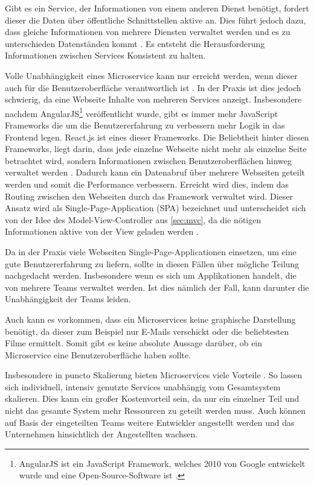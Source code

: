 Gibt es ein Service, der Informationen von einem anderen Dienst benötigt, fordert dieser die Daten über öffentliche Schnittstellen aktive an. Dies führt jedoch dazu, dass gleiche Informationen von mehrere Diensten verwaltet werden und es zu unterschieden Datenständen kommt \parencite[vgl.][Kap. 4.1]{wolff_microservices_2018}. Es entsteht die Herausforderung Informationen zwischen Services Konsistent zu halten.

Volle Unabhängigkeit eines Microservice kann nur erreicht werden, wenn dieser auch für die Benutzeroberfläche verantwortlich ist \parencite[vgl.][Kap. 4.4]{wolff_microservices_2018}. In der Praxis ist dies jedoch schwierig, da eine Webseite Inhalte von mehreren Services anzeigt. Insbesondere nachdem AngularJS\footnote{AngularJS ist ein JavaScript Framework, welches 2010 von Google entwickelt wurde und eine Open-Source-Software ist \parencite{angularjs}.} veröffentlicht wurde, gibt es immer mehr JavaScript Frameworks die um die Benutzererfahrung zu verbessern mehr Logik in das Frontend legen. React.js ist eines dieser Frameworks. Die Beliebtheit hinter diesen Frameworks, liegt darin, dass jede einzelne Webseite nicht mehr als einzelne Seite betrachtet wird, sondern Informationen zwischen Benutzeroberflächen hinweg verwaltet werden \parencite[vgl.][Kap. 9.1]{wolff_microservices_2018}. Dadurch kann ein Datenabruf über mehrere Webseiten geteilt werden und somit die Performance verbessern. Erreicht wird dies, indem das Routing zwischen den Webseiten durch das Framework verwaltet wird. Dieser Ansatz wird als Single-Page-Application (SPA) bezeichnet und unterscheidet sich von der Idee des Model-View-Controller aus \cref{sec:mvc}, da die nötigen Informationen aktive von der View geladen werden \parencite{single-page-webanwendung_2019}.

Da in der Praxis viele Webseiten Single-Page-Applicationen einsetzen, um eine gute Benutzererfahrung zu liefern, sollte in diesen Fällen über mögliche Teilung nachgedacht werden. Insbesondere wenn es sich um Applikationen handelt, die von mehrere Teams verwaltet werden. Ist dies nämlich der Fall, kann darunter die Unabhängigkeit der Teams leiden.

Auch kann es vorkommen, dass ein Microservices keine graphische Darstellung benötigt, da dieser zum Beispiel nur E-Mails verschickt oder die beliebtesten Filme ermittelt. Somit gibt es keine absolute Aussage darüber, ob ein Microservice eine Benutzeroberfläche haben sollte.

Insbesondere in puncto Skalierung bieten Microservices viele Vorteile \parencite[vgl.][Kap. 2.1.4]{newman_monolith_2019}. So lassen sich individuell, intensiv genutzte Services unabhängig vom Gesamtsystem skalieren. Dies kann ein großer Kostenvorteil sein, da nur ein einzelner Teil und nicht das gesamte System mehr Ressourcen zu geteilt werden muss. Auch können auf Basis der eingeteilten Teams weitere Entwickler angestellt werden und das Unternehmen hinsichtlich der Angestellten wachsen.

